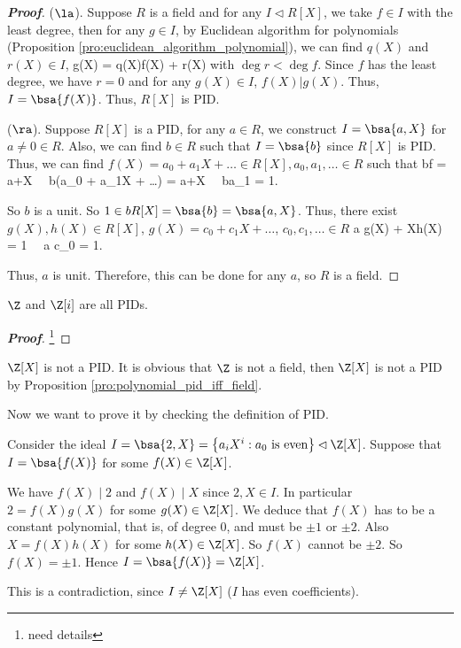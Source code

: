 \begin{proof}[\bf Proof]
($\la$). Suppose $R$ is a field and for any $I \lhd R[X]$, we take $f\in I$ with the least degree, then for any $g\in I$, by Euclidean algorithm for polynomials (Proposition \ref{pro:euclidean_algorithm_polynomial}), we can find $q(X)$ and $r(X)\in I$,
\be
g(X) = q(X)f(X) + r(X)
\ee
with $\deg r < \deg f$. Since $f$ has the least degree, we have $r = 0$ and for any $g(X)\in I$, $f(X)|g(X)$. Thus, $I = \bsa{f(X)}$. Thus, $R[X]$ is PID.

($\ra$). Suppose $R[X]$ is a PID, for any $a\in R$, we construct $I = \bsa{a,X}$ for $a\neq 0 \in R$. Also, we can find $b\in R$ such that $I = \bsa{b}$ since $R[X]$ is PID. Thus, we can find $f(X) = a_0 + a_1 X + \dots \in R[X], a_0,a_1,\dots \in R$ such that
\be
bf = a+X \ \ra \ b(a_0 + a_1X + \dots ) = a+X \ \ra \ ba_1 = 1.
\ee

So $b$ is a unit. So $1\in b R[X] = \bsa{b} = \bsa{a,X}$. Thus, there exist $g(X),h(X) \in R[X]$, $g(X) = c_0 + c_1 X + \dots$, $c_0,c_1,\dots \in R$
\be
a g(X) + Xh(X) = 1 \ \ra \ a c_0 = 1.
\ee

Thus, $a$ is unit. Therefore, this can be done for any $a$, so $R$ is a field.
\end{proof}

\begin{proposition}\label{pro:pid_examples}
$\Z$ and $\Z[i]$ are all PIDs.
\end{proposition}

\begin{proof}[\bf Proof]
\footnote{need details}
\end{proof}

\begin{example}
$\Z[X]$ is not a PID. It is obvious that $\Z$ is not a field, then $\Z[X]$ is not a PID by Proposition \ref{pro:polynomial_pid_iff_field}.

Now we want to prove it by checking the definition of PID.

Consider the ideal $I = \bsa{2,X} = \left\{a_iX^i : a_0 \text{ is even}\right\} \lhd \Z[X]$. Suppose that $I = \bsa{f(X)}$ for some $f(X) \in \Z[X]$.

We have $f(X)\mid 2$ and $f(X)\mid X$ since $2,X \in I$. In particular $2 = f(X)g(X)$ for some $g(X) \in \Z[X]$. We deduce that $f(X)$ has to be a constant polynomial, that is, of degree 0, and must be $\pm 1$ or $\pm 2$. Also $X = f(X)h(X)$ for some $h(X) \in \Z[X]$. So $f(X)$ cannot be $\pm 2$. So $f(X) = \pm 1$. Hence $I = \bsa{f(X)} = \Z[X]$.

This is a contradiction, since $I \neq \Z[X]$ ($I$ has even coefficients).%
\end{example}

